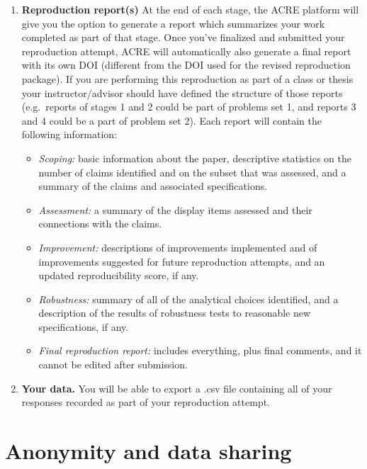\documentclass[]{book}
\providecommand{\tightlist}{%
  \setlength{\itemsep}{0pt}\setlength{\parskip}{0pt}}
\begin{document}
\begin{enumerate}
\def\labelenumi{\arabic{enumi}.}
\setcounter{enumi}{1}
\tightlist
\item
  \textbf{Reproduction report(s)} At the end of each stage, the ACRE platform will give you the option to generate a report which summarizes your work completed as part of that stage. Once you've finalized and submitted your reproduction attempt, ACRE will automatically also generate a final report with its own DOI (different from the DOI used for the revised reproduction package). If you are performing this reproduction as part of a class or thesis your instructor/advisor should have defined the structure of those reports (e.g.~reports of stages 1 and 2 could be part of problems set 1, and reports 3 and 4 could be a part of problem set 2). Each report will contain the following information:

  \begin{itemize}
  \tightlist
  \item
    \emph{Scoping:} basic information about the paper, descriptive statistics on the number of claims identified and on the subset that was assessed, and a summary of the claims and associated specifications.
  \item
    \emph{Assessment:} a summary of the display items assessed and their connections with the claims.
  \item
    \emph{Improvement:} descriptions of improvements implemented and of improvements suggested for future reproduction attempts, and an updated reproducibility score, if any.
  \item
    \emph{Robustness:} summary of all of the analytical choices identified, and a description of the results of robustness tests to reasonable new specifications, if any.\\
  \item
    \emph{Final reproduction report:} includes everything, plus final comments, and it cannot be edited after submission.
  \end{itemize}
\item
  \textbf{Your data.} You will be able to export a .csv file containing all of your responses recorded as part of your reproduction attempt.
\end{enumerate}

\hypertarget{anonymity-and-data-sharing}{%
\section{Anonymity and data sharing}\label{anonymity-and-data-sharing}}
\end{document}
